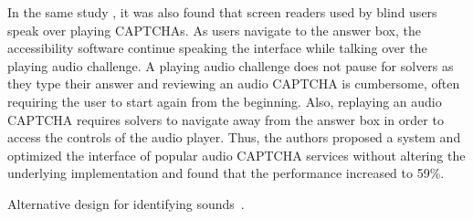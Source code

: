 In the same study \cite{bigham2009evaluating}, it was also found that screen readers used by blind users speak over
playing CAPTCHAs. As users navigate to the answer box, the accessibility software continue speaking the interface while
talking over the playing audio challenge. A playing audio challenge does not pause for solvers as they type their answer
and reviewing an audio CAPTCHA is cumbersome, often requiring the user to start again from the beginning. Also, replaying
an audio CAPTCHA requires solvers to navigate away from the answer box in order to access the controls of the audio player.
Thus, the authors proposed a system and optimized the interface of popular audio CAPTCHA services without altering the
underlying implementation and found that the performance increased to 59\%. 

Alternative design for identifying sounds~\cite{Lazar:2012}.
